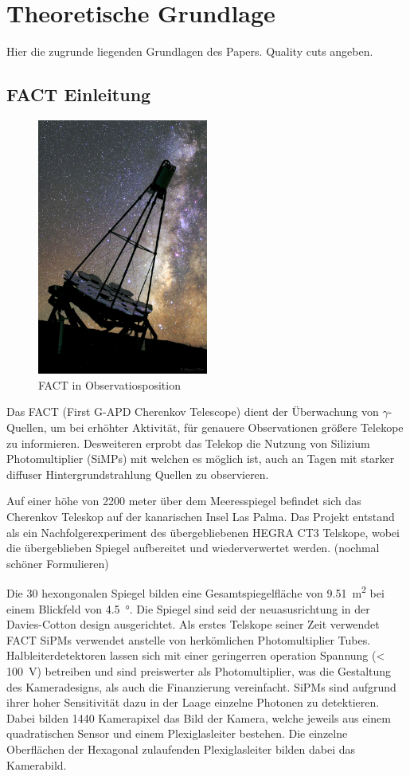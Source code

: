 \chapter{Theoretische Grundlage}
Hier die zugrunde liegenden Grundlagen des Papers.
Quality cuts angeben.

\section{FACT Einleitung}
\begin{figure}
  \includegraphics[width=0.5\textwidth]{./images/FACT.jpg}
  \caption{FACT in Observatiosposition}
  \label{fig:observ}
\end{figure}
Das FACT (First G-APD Cherenkov Telescope) dient der Überwachung von $\gamma$-Quellen, um bei erhöhter Aktivität, für genauere Observationen größere Telekope zu informieren. 
Desweiteren erprobt das Telekop die Nutzung von Silizium Photomultiplier (SiMPs) mit welchen es möglich ist, auch an Tagen mit starker diffuser Hintergrundstrahlung Quellen zu observieren. 

Auf einer höhe von 2200 meter über dem Meeresspiegel befindet sich das Cherenkov Teleskop auf der kanarischen Insel Las Palma. 
Das Projekt entstand als ein Nachfolgerexperiment des übergebliebenen HEGRA CT3 Telskope, wobei die übergeblieben Spiegel aufbereitet und wiederverwertet werden. (nochmal schöner Formulieren)

Die 30 hexongonalen Spiegel bilden eine Gesamtspiegelfläche von \SI{9.51}{\meter\squared} bei einem Blickfeld von \SI{4.5}{\degree}. 
Die Spiegel sind seid der neuasusrichtung in der Davies-Cotton design ausgerichtet. \cite{??} 
Als erstes Telskope seiner Zeit verwendet FACT SiPMs verwendet anstelle von herkömlichen Photomultiplier Tubes. 
Halbleiterdetektoren lassen sich mit einer geringerren operation Spannung (< \SI{100}{\volt}) betreiben und sind preiswerter als Photomultiplier, was die Gestaltung des Kameradesigns, als auch die Finanzierung vereinfacht. 
SiPMs sind aufgrund ihrer hoher Sensitivität dazu in der Laage einzelne Photonen zu detektieren.
Dabei bilden 1440 Kamerapixel das Bild der Kamera, welche jeweils aus einem quadratischen Sensor und einem Plexiglasleiter bestehen. Die einzelne Oberflächen der Hexagonal zulaufenden Plexiglasleiter bilden dabei das Kamerabild.

